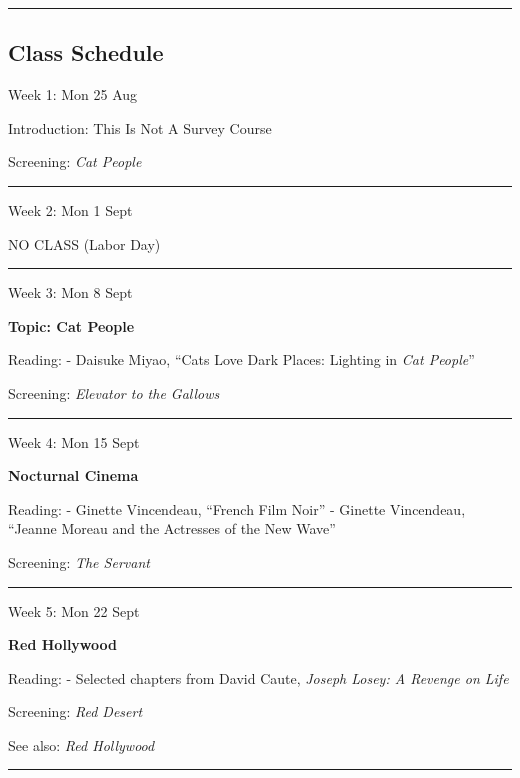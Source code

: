 \documentclass[
  letterpaper,
  DIV=11,
  numbers=noendperiod,
  oneside]{scrartcl}
\begin{document}
\begin{center}\rule{0.5\linewidth}{0.5pt}\end{center}

\subsection{Class Schedule}\label{class-schedule}

Week 1: Mon 25 Aug

Introduction: This Is Not A Survey Course

Screening: \emph{Cat People}

\begin{center}\rule{0.5\linewidth}{0.5pt}\end{center}

Week 2: Mon 1 Sept

NO CLASS (Labor Day)

\begin{center}\rule{0.5\linewidth}{0.5pt}\end{center}

Week 3: Mon 8 Sept

\textbf{Topic: Cat People}

Reading: - Daisuke Miyao, ``Cats Love Dark Places: Lighting in \emph{Cat
People}''

Screening: \emph{Elevator to the Gallows}

\begin{center}\rule{0.5\linewidth}{0.5pt}\end{center}

Week 4: Mon 15 Sept

\textbf{Nocturnal Cinema}

Reading: - Ginette Vincendeau, ``French Film Noir'' - Ginette
Vincendeau, ``Jeanne Moreau and the Actresses of the New Wave''

Screening: \emph{The Servant}

\begin{center}\rule{0.5\linewidth}{0.5pt}\end{center}

Week 5: Mon 22 Sept

\textbf{Red Hollywood}

Reading: - Selected chapters from David Caute, \emph{Joseph Losey: A
Revenge on Life}

Screening: \emph{Red Desert}

See also: \emph{Red Hollywood}

\begin{center}\rule{0.5\linewidth}{0.5pt}\end{center}
\end{document}

